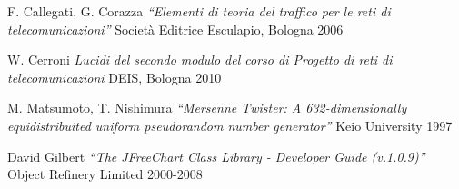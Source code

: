 \begin{thebibliography}{20}

  F. Callegati, G. Corazza
  \emph{``Elementi di teoria del traffico per le reti di telecomunicazioni''}
  Societ\`a Editrice Esculapio, Bologna
  2006

  W. Cerroni
  \emph{Lucidi del secondo modulo del corso di Progetto di reti di telecomunicazioni}
  DEIS, Bologna
  2010

  M. Matsumoto, T. Nishimura
  \emph{``Mersenne Twister: A 632-dimensionally equidistribuited uniform pseudorandom number generator''}
  Keio University
  1997

  David Gilbert
  \emph{``The JFreeChart Class Library - Developer Guide (v.1.0.9)''}
  Object Refinery Limited
  2000-2008


\end{thebibliography}
